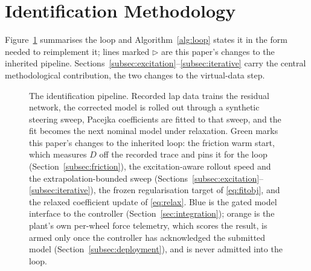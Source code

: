 \section{Identification Methodology}
\label{sec:method}

Figure~\ref{fig:pipeline} summarises the loop and Algorithm~\ref{alg:loop}
states it in the form needed to reimplement it; lines marked $\triangleright$
are this paper's changes to the inherited pipeline.
Sections~\ref{subsec:excitation}--\ref{subsec:iterative} carry the central
methodological contribution, the two changes to the virtual-data step.

\begin{figure}[t]
\centering
\resizebox{0.98\textwidth}{!}{}
\caption{The identification pipeline. Recorded lap data trains the residual
network, the corrected model is rolled out through a synthetic steering sweep,
Pacejka coefficients are fitted to that sweep, and the fit becomes the next
nominal model under relaxation. Green marks this paper's changes to the inherited loop: the friction
warm start, which measures $D$ off the recorded trace and pins it for the loop
(Section~\ref{subsec:friction}), the
excitation-aware rollout speed and the extrapolation-bounded sweep
(Sections~\ref{subsec:excitation}--\ref{subsec:iterative}), the frozen
regularisation target of \eqref{eq:fitobj}, and the relaxed coefficient update
of \eqref{eq:relax}. Blue is the gated model interface
to the controller (Section~\ref{sec:integration}); orange is the plant's own
per-wheel force telemetry, which scores the result, is armed only once the
controller has acknowledged the submitted model
(Section~\ref{subsec:deployment}), and is never admitted into the loop.}
\label{fig:pipeline}
\end{figure}


